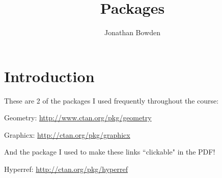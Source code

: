 \documentclass{article}
\title{Packages}
\author{Jonathan Bowden}
\date{}
\begin{document}
\maketitle

\section{Introduction}

These are 2 of the packages I used frequently throughout the course:

Geometry: \url{http://www.ctan.org/pkg/geometry}   

Graphicx: \url{http://ctan.org/pkg/graphicx}

\noindent And the package I used to make these links ``clickable" in the PDF!

Hyperref: \url{http://ctan.org/pkg/hyperref}
\end{document}
